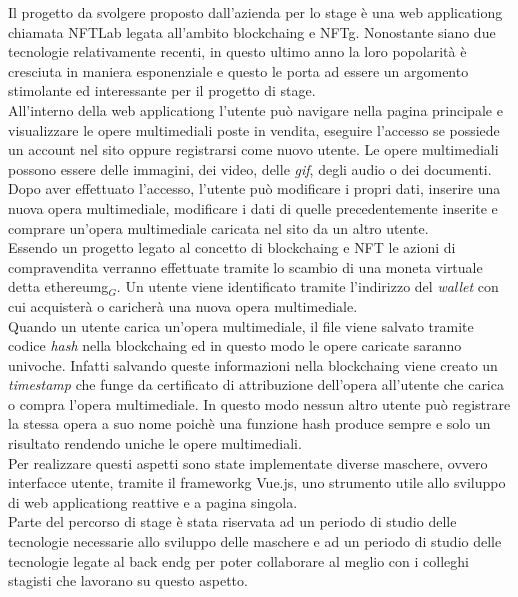 Il progetto da svolgere proposto dall'azienda per lo stage è una \gls{web applicationg} chiamata NFTLab legata all'ambito \gls{blockchaing} e \gls{NFTg}. Nonostante siano due tecnologie relativamente recenti, in questo ultimo anno la loro popolarità è cresciuta in maniera esponenziale e questo le porta ad essere un argomento stimolante ed interessante per il progetto di stage.\\
All'interno della \gls{web applicationg} l'utente può navigare nella pagina principale e visualizzare le opere multimediali poste in vendita, eseguire l'accesso se possiede un account nel sito oppure registrarsi come nuovo utente. Le opere multimediali possono essere delle immagini, dei video, delle \textit{gif}, degli audio o dei documenti. \\
Dopo aver effettuato l'accesso, l'utente può modificare i propri dati, inserire una nuova opera multimediale, modificare i dati di quelle precedentemente inserite e comprare un'opera multimediale caricata nel sito da un altro utente.\\
Essendo un progetto legato al concetto di \gls{blockchaing} e \gls{NFT} le azioni di compravendita verranno effettuate tramite lo scambio di una moneta virtuale detta \gls{ethereumg}$_G$. Un utente viene identificato tramite l'indirizzo del \textit{wallet} con cui acquisterà o caricherà una nuova opera multimediale.\\
Quando un utente carica un'opera multimediale, il file viene salvato tramite codice \textit{hash} nella \gls{blockchaing} ed in questo modo le opere caricate saranno univoche. Infatti salvando queste informazioni nella \gls{blockchaing} viene creato un \textit{timestamp} che funge da certificato di attribuzione dell'opera all'utente che carica o compra l'opera multimediale. In questo modo nessun altro utente può registrare la stessa opera a suo nome poichè una funzione hash produce sempre e solo un risultato rendendo uniche le opere multimediali.\\
Per realizzare questi aspetti sono state implementate diverse maschere, ovvero interfacce utente, tramite il \gls{frameworkg} Vue.js, uno strumento utile allo sviluppo di \gls{web applicationg} reattive e a pagina singola.\\
Parte del percorso di stage è stata riservata ad un periodo di studio delle tecnologie necessarie allo sviluppo delle maschere e ad un periodo di studio delle tecnologie legate al \gls{back endg} per poter collaborare al meglio con i colleghi stagisti che lavorano su questo aspetto.

